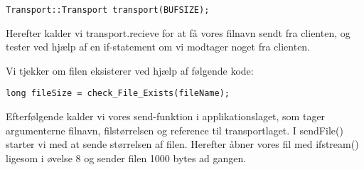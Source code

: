 \begin{lstlisting}
Transport::Transport transport(BUFSIZE);
\end{lstlisting}

Herefter kalder vi transport.recieve for at få vores filnavn sendt fra clienten, og tester ved hjælp af en if-statement om vi modtager noget fra clienten. 

Vi tjekker om filen eksisterer ved hjælp af følgende kode:

\begin{lstlisting}
long fileSize = check_File_Exists(fileName);
\end{lstlisting}

Efterfølgende kalder vi vores send-funktion i applikationslaget, som tager argumenterne filnavn, filstørrelsen og reference til transportlaget. 
I sendFile() starter vi med at sende størrelsen af filen. Herefter åbner vores fil med ifstream() ligesom i øvelse 8 og sender filen 1000 bytes ad gangen. 


 




 

